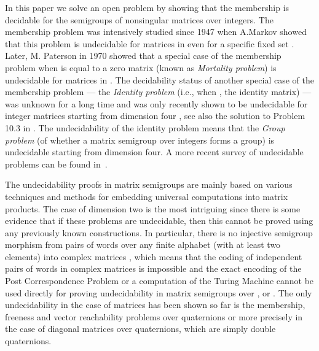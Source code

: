 \documentclass[fontsize=11pt,DIV=13,paper=letter]{scrartcl}
\theoremstyle{definition}
\begin{document}
In this paper we solve an open problem by showing that  
the membership is decidable
for the semigroups of  nonsingular matrices over integers.
The membership problem was intensively studied since 1947 when A.Markov showed that 
this problem is undecidable for matrices in  even for a specific fixed set  \cite{Markov}. 
Later, M. Paterson in 1970 showed that a special case of the membership problem when  is equal to a zero matrix (known as {\sl Mortality problem})
is undecidable for matrices in . The decidability status of another special case of 
the membership problem --- the {\sl Identity problem} (i.e., when , the identity matrix) --- was unknown for a long time and
was only recently shown to be undecidable for integer matrices starting from dimension four \cite{Identity}, see also the solution to Problem 10.3 in \cite{solution10-3}. The undecidability of the
identity problem means that the {\sl Group problem} (of whether a matrix semigroup over integers forms a group) is undecidable 
starting from dimension four. A more recent survey of undecidable problems can be found in~\cite{CassaigneHHN14}.

The undecidability proofs in matrix semigroups are mainly based on  various techniques and methods for embedding
universal computations into matrix products. The case of dimension two is the most intriguing
since there is some evidence that if these problems are undecidable, then this cannot be proved using 
any previously known constructions. In particular, there is no injective semigroup morphism from pairs of words over any finite
alphabet (with at least two elements) into complex  matrices \cite{CHK99},
which means that the coding of independent pairs of words in  complex matrices is impossible and the exact encoding of
the Post Correspondence Problem or a computation of the Turing Machine cannot be used directly for proving undecidability
in  matrix semigroups over ,  or .
The only undecidability in the case of  matrices has been shown so far is the membership, 
freeness and vector reachability problems over quaternions \cite{BP_IC2008} or more precisely in the case of diagonal matrices over quaternions, 
which are simply double quaternions.
 
\end{document}
